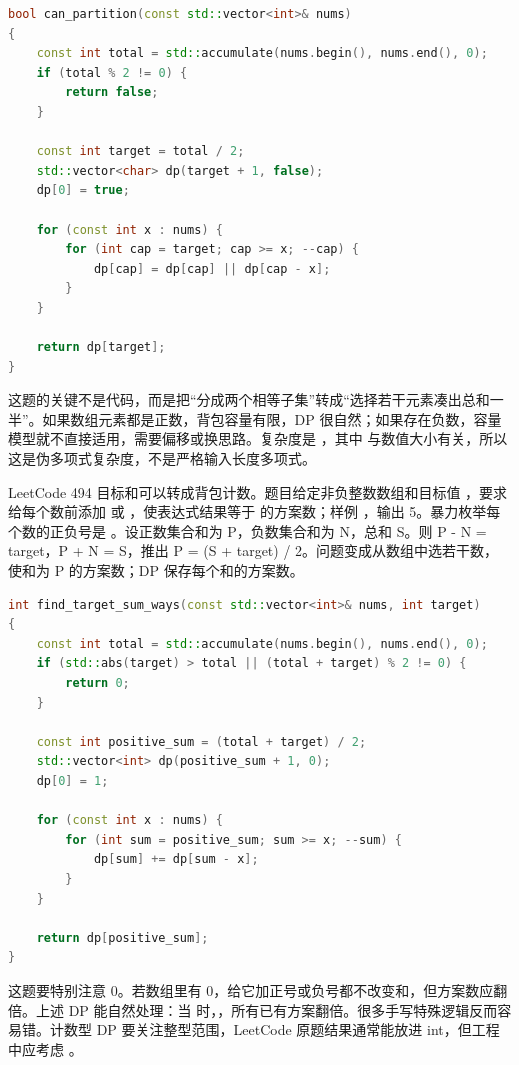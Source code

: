 \begin{lstlisting}[language=C++,caption={LeetCode 416 分割等和子集：0-1 背包可达性}]
bool can_partition(const std::vector<int>& nums)
{
    const int total = std::accumulate(nums.begin(), nums.end(), 0);
    if (total % 2 != 0) {
        return false;
    }

    const int target = total / 2;
    std::vector<char> dp(target + 1, false);
    dp[0] = true;

    for (const int x : nums) {
        for (int cap = target; cap >= x; --cap) {
            dp[cap] = dp[cap] || dp[cap - x];
        }
    }

    return dp[target];
}
\end{lstlisting}

这题的关键不是代码，而是把“分成两个相等子集”转成“选择若干元素凑出总和一半”。如果数组元素都是正数，背包容量有限，DP 很自然；如果存在负数，容量模型就不直接适用，需要偏移或换思路。复杂度是 ，其中  与数值大小有关，所以这是伪多项式复杂度，不是严格输入长度多项式。

LeetCode 494 目标和可以转成背包计数。题目给定非负整数数组和目标值 ，要求给每个数前添加 \code{+} 或 \code{-}，使表达式结果等于  的方案数；样例 ，输出 5。暴力枚举每个数的正负号是 。设正数集合和为 P，负数集合和为 N，总和 S。则 P - N = target，P + N = S，推出 P = (S + target) / 2。问题变成从数组中选若干数，使和为 P 的方案数；DP 保存每个和的方案数。

\begin{lstlisting}[language=C++,caption={LeetCode 494 目标和：转换为 0-1 背包计数}]
int find_target_sum_ways(const std::vector<int>& nums, int target)
{
    const int total = std::accumulate(nums.begin(), nums.end(), 0);
    if (std::abs(target) > total || (total + target) % 2 != 0) {
        return 0;
    }

    const int positive_sum = (total + target) / 2;
    std::vector<int> dp(positive_sum + 1, 0);
    dp[0] = 1;

    for (const int x : nums) {
        for (int sum = positive_sum; sum >= x; --sum) {
            dp[sum] += dp[sum - x];
        }
    }

    return dp[positive_sum];
}
\end{lstlisting}

这题要特别注意 0。若数组里有 0，给它加正号或负号都不改变和，但方案数应翻倍。上述 DP 能自然处理：当  时，，所有已有方案翻倍。很多手写特殊逻辑反而容易错。计数型 DP 要关注整型范围，LeetCode 原题结果通常能放进 int，但工程中应考虑 。

